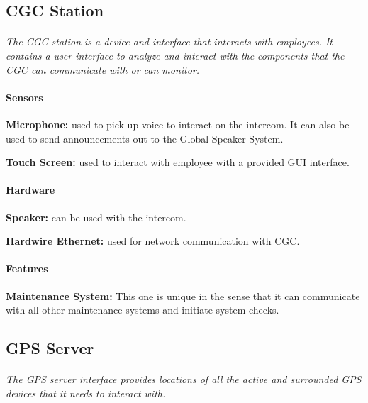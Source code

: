 \documentclass[12pt]{article}
\begin{document}
	\subsection{CGC Station}
	\paragraph{} \textit{The CGC station is a device and interface that interacts with employees. It contains a user interface to analyze and interact with the components that the CGC can communicate with or can monitor. }		
	
	\paragraph{Sensors}
	\begin{list}{}{}
		\item \textbf{Microphone: }used to pick up voice to interact on the intercom. It can also be used to send announcements out to the Global Speaker System.
		\item \textbf{Touch Screen: }used to interact with employee with a provided GUI interface.
	\end{list}
		
	\paragraph{Hardware}
	\begin{list}{}{}
		\item \textbf{Speaker: }can be used with the intercom.
		\item \textbf{Hardwire Ethernet: }used for network communication with CGC. 
	\end{list}
	
	\paragraph{Features}
	\begin{list}{}{}
		\item \textbf{Maintenance System: }This one is unique in the sense that it can communicate with all other maintenance systems and initiate system checks. 
	\end{list}

	\subsection{GPS Server}
	\paragraph{} \textit{The GPS server interface provides locations of all the active and surrounded GPS devices that it needs to interact with. }		
	
\end{document}
